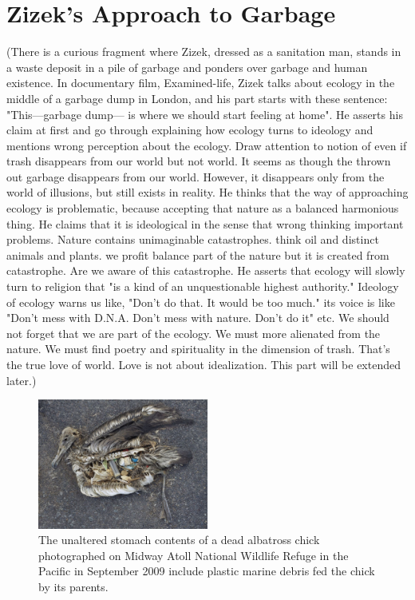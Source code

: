 \section{Zizek's Approach to Garbage}
(There is a curious fragment where Zizek, dressed as a sanitation man, stands in a waste deposit in a pile of garbage and ponders over garbage and human existence. In documentary film, Examined-life, Zizek talks about ecology in the middle of a garbage dump in London, and his part starts with these sentence: "This---garbage dump--- is where we should start feeling at home". He asserts his claim at first and go through explaining how ecology turns to ideology and mentions wrong perception about the ecology. Draw attention to notion of even if trash disappears from our world but not world. It seems as though the thrown out garbage disappears from our world. However, it disappears only from the world of illusions, but still exists in reality. He thinks that the way of approaching ecology is problematic, because accepting that nature as a balanced harmonious thing. He claims that it is ideological in the sense that wrong thinking important problems. Nature contains unimaginable catastrophes. think oil and distinct animals and plants. we profit balance part of the nature but it is created from catastrophe. Are we aware of this catastrophe. He asserts that ecology will slowly turn to religion that "is a kind of an unquestionable highest authority." Ideology of ecology warns us like, "Don't do that. It would be too much." its voice is like "Don't mess with D.N.A. Don't mess with nature. Don't do it" etc. We should not forget that we are part of the ecology. We must more alienated from the nature. We must find poetry and spirituality in the dimension of trash. That's the true love of world. Love is not about idealization. This part will be extended later.)

  \begin{figure}[h!]
      \centering
      \includegraphics[width=0.5\textwidth]{graphics/ChrisJordan-Albatross.jpg}
      \caption[Chris Jordan, Albatross at Midway Atoll Refuge, 2009]{The unaltered stomach contents of a dead albatross chick photographed on Midway Atoll National Wildlife Refuge in the Pacific in September 2009 include plastic marine debris fed the chick by its parents.}
      \label{fig:ChrisJordan_Albatross}
  \end{figure}

